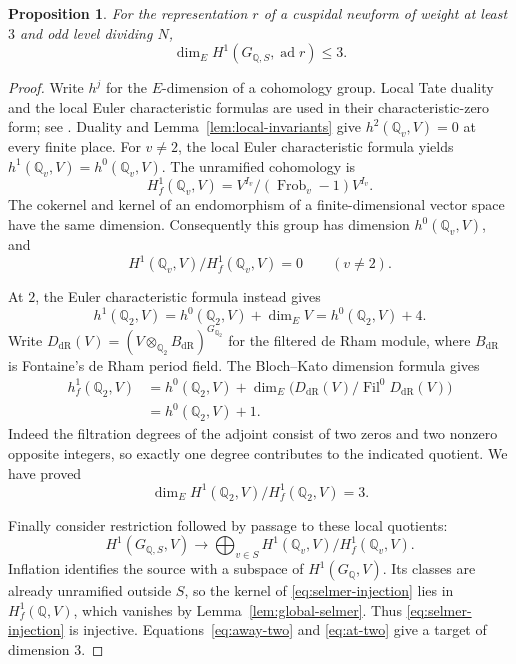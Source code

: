 \documentclass[11pt]{article}
\newtheorem{proposition}[theorem]{Proposition}
\theoremstyle{remark}
\numberwithin{equation}{section}
\newcommand{\Q}{\mathbb Q}
\DeclareMathOperator{\ad}{ad}
\DeclareMathOperator{\Frob}{Frob}
\DeclareMathOperator{\Fil}{Fil}
\begin{document}
\begin{proposition}\label{prop:cohomology}
For the representation $r$ of a cuspidal newform of weight at
least $3$ and odd level dividing $N$,
\[
 \dim_E H^1(G_{\Q,S},\ad r)\leq3.
\]
\end{proposition}
\begin{proof}
Write $h^j$ for the $E$-dimension of a cohomology group.
Local Tate duality and the local Euler characteristic formulas
are used in their characteristic-zero form; see
\cite[Chapter~7]{NeukirchSchmidtWingberg08}.
Duality and Lemma~\ref{lem:local-invariants} give
$h^2(\Q_v,V)=0$ at every finite place. For $v\ne2$, the
local Euler characteristic formula yields
$h^1(\Q_v,V)=h^0(\Q_v,V)$. The unramified cohomology is
\[
 H^1_f(\Q_v,V)=
 V^{I_v}/(\Frob_v-1)V^{I_v}.
\]
The cokernel and kernel of an endomorphism of a finite-dimensional
vector space have the same dimension. Consequently this group
has dimension $h^0(\Q_v,V)$, and
\begin{equation}\label{eq:away-two}
 H^1(\Q_v,V)/H^1_f(\Q_v,V)=0\qquad(v\ne2).
\end{equation}

At $2$, the Euler characteristic formula instead gives
\[
 h^1(\Q_2,V)=h^0(\Q_2,V)+\dim_E V
            =h^0(\Q_2,V)+4.
\]
Write
$D_{\mathrm{dR}}(V)=(V\otimes_{\Q_2}B_{\mathrm{dR}})^{G_{\Q_2}}$
for the filtered de Rham module, where $B_{\mathrm{dR}}$ is
Fontaine's de Rham period field. The Bloch--Kato dimension formula
\cite[Corollary~3.8.4]{BlochKato90} gives
\begin{align*}
 h^1_f(\Q_2,V)
 &=h^0(\Q_2,V)+
   \dim_E\bigl(D_{\mathrm{dR}}(V)/\Fil^0D_{\mathrm{dR}}(V)\bigr)\\
 &=h^0(\Q_2,V)+1.
\end{align*}
Indeed the filtration degrees of the adjoint consist of two
zeros and two nonzero opposite integers, so exactly one degree
contributes to the indicated quotient. We have proved
\begin{equation}\label{eq:at-two}
 \dim_E H^1(\Q_2,V)/H^1_f(\Q_2,V)=3.
\end{equation}

Finally consider restriction followed by passage to these local
quotients:
\begin{equation}\label{eq:selmer-injection}
 H^1(G_{\Q,S},V)\longrightarrow
 \bigoplus_{v\in S}H^1(\Q_v,V)/H^1_f(\Q_v,V).
\end{equation}
Inflation identifies the source with a subspace of
$H^1(G_{\Q},V)$. Its classes are already unramified outside $S$,
so the kernel of \eqref{eq:selmer-injection} lies in
$H^1_f(\Q,V)$, which vanishes by
Lemma~\ref{lem:global-selmer}. Thus \eqref{eq:selmer-injection}
is injective. Equations~\eqref{eq:away-two} and
\eqref{eq:at-two} give a target of dimension $3$.
\end{proof}
\end{document}
